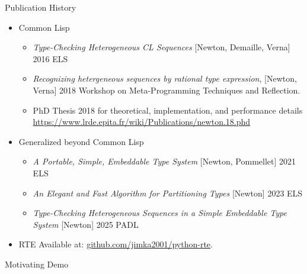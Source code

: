 \begin{frame}{Publication History}
  \begin{itemize}
  \item Common Lisp
    
    \begin{itemize}
    \item \textit{Type-Checking Heterogeneous CL Sequences} [Newton, Demaille, Verna] 2016 ELS
    \item \textit{Recognizing hetergeneous sequences by rational type
      expression}, [Newton, Verna] 2018 Workshop on Meta-Programming
      Techniques and Reflection.
    \item PhD Thesis 2018 for theoretical, implementation, and performance details
      \url{https://www.lrde.epita.fr/wiki/Publications/newton.18.phd}
      
    \end{itemize}
  \item Generalized beyond Common Lisp
    \begin{itemize}
    \item \textit{A Portable, Simple, Embeddable Type System} [Newton, Pommellet] 2021 ELS
      
    \item \textit{An Elegant and Fast Algorithm for Partitioning Types} [Newton] 2023 ELS
    \item \textit{Type-Checking Heterogeneous Sequences in a Simple Embeddable Type System} [Newton] 2025 PADL
    \end{itemize}
  \item   RTE Available at: \url{github.com/jimka2001/python-rte}.
  \end{itemize}
\end{frame}



\begin{frame}{Motivating Demo}

\end{frame}
